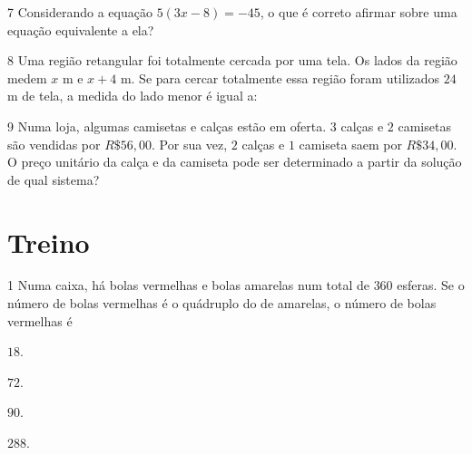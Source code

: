 \pagebreak
\num{7}  Considerando a equação $5(3x - 8) = -45$, o que
é correto afirmar sobre uma equação equivalente a ela?


\num{8}  Uma região retangular foi totalmente cercada por uma tela. Os lados
da região medem $x$ m e $x + 4$ m.
Se para cercar totalmente essa região foram utilizados $24$ m de tela, a
medida do lado menor é igual a:


\begin{emptybox}
\vspace{5cm}
\end{emptybox}

\num{9} Numa loja, algumas camisetas e calças estão em oferta. $3$ calças e $2$
camisetas são vendidas por $R\$ 56,00$. Por sua vez, $2$ calças e $1$ camiseta
saem por $R\$ 34,00$. O preço unitário da calça e da camiseta pode ser
determinado a partir da solução de qual sistema?

\begin{emptybox}

\vspace{5cm}
\end{emptybox}

\section*{Treino}

\num{1}  Numa caixa, há bolas vermelhas e bolas amarelas num total de $360$
esferas. Se o número de bolas vermelhas é o quádruplo do de amarelas, o
número de bolas vermelhas é

\begin{escolha}
\item $18$.
\item $72$.
\item $90$.
\item $288$.
\end{escolha}


